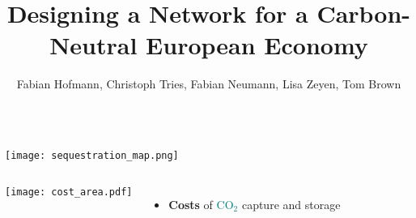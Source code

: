 \documentclass[12pt, aspectratio=169]{beamer}
\title{Designing a \carbon{} Network for a Carbon-Neutral European Economy}
\author{Fabian Hofmann, Christoph Tries, Fabian Neumann, Lisa Zeyen, Tom Brown}
\institute{Technical University Berlin}
\date{}
\newcommand{\carbon}{\textcolor{teal}{CO$_2$}}
\begin{document}
\begin{frame}[plain]
\titlepage
\end{frame}

\begin{frame}[plain]
\begin{columns}
\texttt{[image: sequestration\_map.png]}
\end{columns}
\end{frame}

\begin{frame}[plain]
\begin{columns}
\texttt{[image: cost\_area.pdf]}
\pause
\vspace{3cm}
\color{teal}
\begin{itemize}
\color{teal}
\item \textbf{Costs} of \carbon{} capture and storage
\end{itemize}

\color{black}
\end{columns}
\end{frame}
\end{document}
